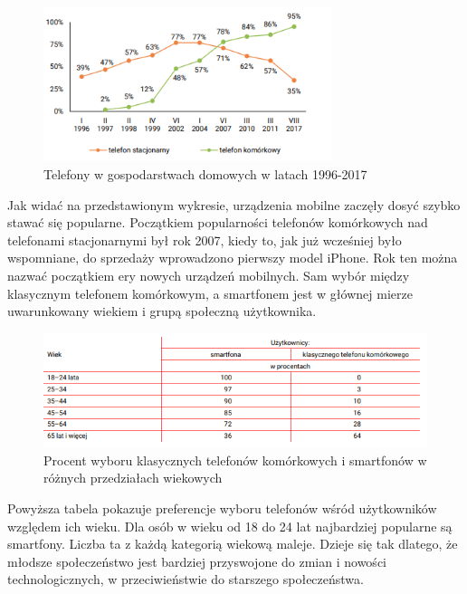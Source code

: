 \documentclass[a4paper,12pt,oneside]{book}
\begin{document}
	\newpage
	\begin{figure}[h]
		\centering
		\includegraphics[width=0.75\textwidth]{grafika/cbos_wykres.png}
		\caption{Telefony w gospodarstwach domowych w latach 1996-2017}
	\end{figure}

	Jak widać na przedstawionym wykresie, urządzenia mobilne zaczęły dosyć szybko stawać się popularne. Początkiem popularności telefonów komórkowych nad telefonami stacjonarnymi był rok 2007, kiedy to, jak już wcześniej było wspomniane, do sprzedaży wprowadzono pierwszy model iPhone. Rok ten można nazwać początkiem ery nowych urządzeń mobilnych. Sam wybór między klasycznym telefonem komórkowym, a smartfonem jest w głównej mierze uwarunkowany wiekiem i grupą społeczną użytkownika.
	
	\begin{figure}[h]
		\centering
		\includegraphics[width=1\textwidth]{grafika/cbos_wykres2.png}
		\caption{Procent wyboru klasycznych telefonów komórkowych i smartfonów w różnych przedziałach wiekowych}
	\end{figure}

	\newpage

	Powyższa tabela pokazuje preferencje wyboru telefonów wśród użytkowników względem ich wieku. Dla osób w wieku od 18 do 24 lat najbardziej popularne są smartfony. Liczba ta z każdą kategorią wiekową maleje. Dzieje się tak dlatego, że młodsze społeczeństwo jest bardziej przyswojone do zmian i nowości technologicznych, w przeciwieństwie do starszego społeczeństwa.
	
\end{document}
